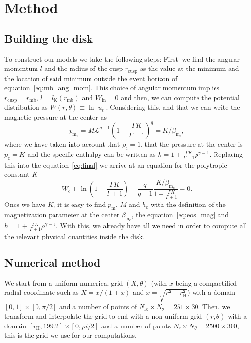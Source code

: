 \documentclass[twocolumn,aps,showpacs,showkeys,prd,superscriptaddress,byrevtex, amsmath]{revtex4-1}
\begin{document}
\section{Method}

\subsection{Building the disk}

To construct our models we take the following steps:
First, we find the angular momentum $l$ and the radius of the cusp $r_{\mathrm{cusp}}$ as the value at the minimum and the location of said minimum outside the event horizon of equation~\eqref{eq:mb_ang_mom}. This choice of angular momentum implies $r_{\mathrm{cusp}} = r_{\mathrm{mb}}$, $l = l_{\mathrm{K}}(r_{\mathrm{mb}})$ and $W_{\mathrm{in}} = 0$ and then, we can compute the potential distribution as $W(r, \theta) \equiv \ln |u_t|$. Considering this, and that we can write the magnetic pressure at the center as
\begin{equation}
p_{\mathrm{m_c}} = M \mathcal{L}^{q-1} \left(1 + \frac{\Gamma K}{\Gamma +1}\right)^q = K/\beta_{\mathrm{m_c}},
\end{equation}
where we have taken into account that $\rho_{\mathrm{c}} = 1$, that the pressure at the center is $p_{\mathrm{c}} = K$ and the specific enthalpy can be written as $h = 1 + \frac{\Gamma K}{\Gamma +1}\rho^{\gamma -1}$. Replacing this into the equation~\eqref{eq:final} we arrive at an equation for the polytropic constant $K$
\begin{equation}\label{eq:K_eq}
W_{\mathrm{c}} + \ln \left(1 + \frac{\Gamma K}{\Gamma +1}\right) + \frac{q}{q-1}\frac{K/\beta_{\mathrm{m_c}}}{1 + \frac{\Gamma K}{\Gamma +1}} = 0.
\end{equation}
Once we have $K$, it is easy to find $p_{\mathrm{m}}$, $M$ and $h_{\mathrm{c}}$ with the definition of the magnetization parameter at the center $\beta_{\mathrm{m_c}}$, the equation~\eqref{eq:eos_mag} and $h = 1 + \frac{\Gamma K}{\Gamma +1}\rho^{\gamma -1}$. With this, we already have all we need in order to compute all the relevant physical quantities inside the disk.

\subsection{Numerical method}
We start from a uniform numerical grid $(X, \theta)$ (with $x$ being a compactified radial coordinate such as $X = x/(1+x)$ and $x = \sqrt{r^2 - r_{\mathrm{H}}^2}$) with a domain $[0, 1] \times [0, \pi/2]$ and a number of points of $N_X \times N_\theta = 251 \times 30$. Then, we transform and interpolate the grid to end with a non-uniform grid $(r, \theta)$ with a domain $[r_{\mathrm{H}}, 199.2] \times [0, pi/2]$ and a number of points $N_r \times N_\theta = 2500 \times 300$, this is the grid we use for our computations.
\end{document}
